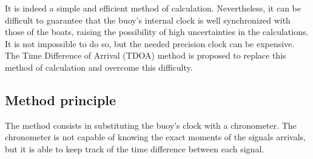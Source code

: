 \documentclass[a4paper]{report}
\begin{document}
It is indeed a simple and efficient method of calculation. Nevertheless, it can be difficult to guarantee that the buoy's internal clock is well synchronized with those of the boats, raising the possibility of high uncertainties in the calculations.
%
It is not impossible to do so, but the needed precision clock can be expensive. The Time Difference of Arrival (TDOA) method is proposed to replace this method of calculation and overcome this difficulty.

\subsection{Method principle}
The method consists in substituting the buoy's clock with a chronometer.
%
The chronometer is not capable of knowing the exact moments of the signals arrivals, but it is able to keep track of the time difference between each signal.
\end{document}
